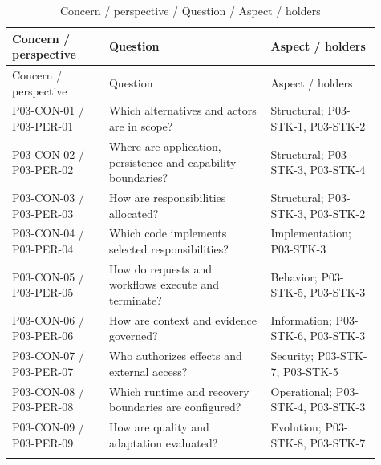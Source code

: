 \documentclass[10pt,letterpaper]{article}
\begin{document}
\begin{longtable}{@{}>{\raggedright\arraybackslash}p{0.24\linewidth}>{\raggedright\arraybackslash}p{0.4\linewidth}>{\raggedright\arraybackslash}p{0.27\linewidth}@{}}
\caption{Concern / perspective / Question / Aspect / holders}\\
\toprule Concern / perspective & Question & Aspect / holders\\\midrule\endfirsthead
\toprule Concern / perspective & Question & Aspect / holders\\\midrule\endhead
P03-CON-01 / P03-PER-01 & Which alternatives and actors are in scope? & Structural; P03-STK-1, P03-STK-2\\\addlinespace
P03-CON-02 / P03-PER-02 & Where are application, persistence and capability boundaries? & Structural; P03-STK-3, P03-STK-4\\\addlinespace
P03-CON-03 / P03-PER-03 & How are responsibilities allocated? & Structural; P03-STK-3, P03-STK-2\\\addlinespace
P03-CON-04 / P03-PER-04 & Which code implements selected responsibilities? & Implementation; P03-STK-3\\\addlinespace
P03-CON-05 / P03-PER-05 & How do requests and workflows execute and terminate? & Behavior; P03-STK-5, P03-STK-3\\\addlinespace
P03-CON-06 / P03-PER-06 & How are context and evidence governed? & Information; P03-STK-6, P03-STK-3\\\addlinespace
P03-CON-07 / P03-PER-07 & Who authorizes effects and external access? & Security; P03-STK-7, P03-STK-5\\\addlinespace
P03-CON-08 / P03-PER-08 & Which runtime and recovery boundaries are configured? & Operational; P03-STK-4, P03-STK-3\\\addlinespace
P03-CON-09 / P03-PER-09 & How are quality and adaptation evaluated? & Evolution; P03-STK-8, P03-STK-7\\\addlinespace
\bottomrule\end{longtable}
\end{document}
